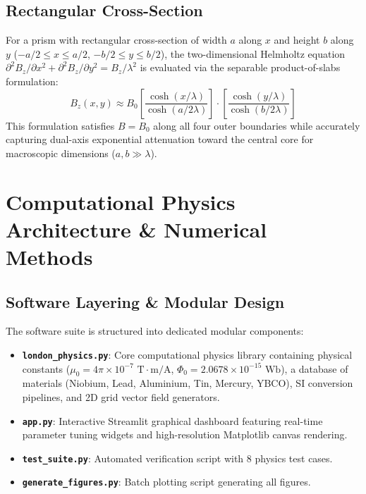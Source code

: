 \documentclass[11pt,a4paper]{article}
\begin{document}
\subsection{Rectangular Cross-Section}
For a prism with rectangular cross-section of width $a$ along $x$ and height $b$ along $y$ ($-a/2 \le x \le a/2$, $-b/2 \le y \le b/2$), the two-dimensional Helmholtz equation $\partial^2 B_z / \partial x^2 + \partial^2 B_z / \partial y^2 = B_z / \lambda^2$ is evaluated via the separable product-of-slabs formulation:
\begin{equation}
    B_z(x, y) \approx B_0 \left[ \frac{\cosh(x / \lambda)}{\cosh(a / 2\lambda)} \right] \cdot \left[ \frac{\cosh(y / \lambda)}{\cosh(b / 2\lambda)} \right]
\end{equation}
This formulation satisfies $B = B_0$ along all four outer boundaries while accurately capturing dual-axis exponential attenuation toward the central core for macroscopic dimensions ($a, b \gg \lambda$).

\section{Computational Physics Architecture \& Numerical Methods}

\subsection{Software Layering \& Modular Design}
The software suite is structured into dedicated modular components:
\begin{itemize}
    \item \textbf{\texttt{london\_physics.py}}: Core computational physics library containing physical constants ($\mu_0 = 4\pi \times 10^{-7}\text{ T}\cdot\text{m/A}$, $\Phi_0 = 2.0678 \times 10^{-15}\text{ Wb}$), a database of materials (Niobium, Lead, Aluminium, Tin, Mercury, YBCO), SI conversion pipelines, and 2D grid vector field generators.
    \item \textbf{\texttt{app.py}}: Interactive Streamlit graphical dashboard featuring real-time parameter tuning widgets and high-resolution Matplotlib canvas rendering.
    \item \textbf{\texttt{test\_suite.py}}: Automated verification script with 8 physics test cases.
    \item \textbf{\texttt{generate\_figures.py}}: Batch plotting script generating all figures.
\end{itemize}
\end{document}
